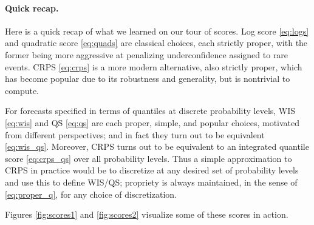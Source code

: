 \documentclass{article}
\begin{document}
\paragraph{Quick recap.}

Here is a quick recap of what we learned on our tour of scores. Log score
\eqref{eq:logs} and quadratic score \eqref{eq:quads} are classical choices, each
strictly proper, with the former being more aggressive at penalizing
underconfidence assigned to rare events. CRPS \eqref{eq:crps} is a more modern
alternative, also strictly proper, which has become popular due to its
robustness and generality, but is nontrivial to compute.        

For forecasts specified in terms of quantiles at discrete probability levels,
WIS \eqref{eq:wis} and QS \eqref{eq:qs} are each proper, simple, and popular
choices, motivated from different perspectives; and in fact they turn out to be 
equivalent \eqref{eq:wis_qs}. Moreover, CRPS turns out to be equivalent
to an integrated quantile score \eqref{eq:crps_qs} over all probability
levels. Thus a simple approximation to CRPS in practice would be to discretize
at any desired set of probability levels and use this to define WIS/QS;
propriety is always maintained, in the sense of \eqref{eq:proper_q}, for any
choice of discretization.     

Figures \ref{fig:scores1} and \ref{fig:scores2} visualize some of these scores
in action. 
\end{document}

